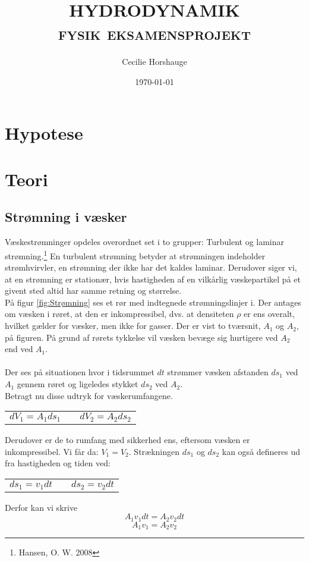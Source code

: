 \documentclass[a4paper, 11pt]{article}
\title{{\large \textsc{HYDRODYNAMIK\\fysik eksamensprojekt}}}
\author{Cecilie Horshauge}
\date{\today}
\begin{document}
\maketitle
\section{Hypotese}
\section{Teori}
\subsection{Strømning i væsker}
Væskestrømninger opdeles overordnet set i to grupper: Turbulent og laminar strømning.\footnote{Hansen, O. W. 2008}
En turbulent strømning betyder at strømningen indeholder strømhvirvler, en strømning der ikke har det kaldes laminar.
Derudover siger vi, at en strømning er stationær, hvis hastigheden af en vilkårlig væskepartikel på et givent sted altid har samme retning og størrelse.
\\
På figur \ref{fig:Strømning} ses et rør med indtegnede strømningslinjer i. Der antages om væsken i røret, at den er inkompressibel, 
dvs. at densiteten \(\rho\) er ens overalt, hvilket gælder for væsker, men ikke for gasser.
Der er vist to tværsnit, \(A_1\) og \(A_2\), på figuren. På grund af rørets tykkelse vil væsken bevæge sig hurtigere ved \(A_2\) end ved \(A_1\).\\\\
Der ses på situationen hvor i tidsrummet \(dt\) strømmer væsken afstanden \(ds_1\) ved \(A_1\) gennem røret og ligeledes stykket \(ds_2\) ved \(A_2\).\\
Betragt nu disse udtryk for væskerumfangene.
\begin{center}
    \begin{tabular}{ l c l }
     \(dV_1=A_1ds_1\) & & \(dV_2=A_2ds_2\)
    \end{tabular}
\end{center}
Derudover er de to rumfang med sikkerhed ens, eftersom væsken er inkompressibel. Vi får da: \(V_1 = V_2\). Strækningen \(ds_1\) og \(ds_2\) kan også defineres ud fra hastigheden og tiden ved:
\begin{center}
    \begin{tabular}{ l c l }
     \(ds_1=v_1dt\) & & \(ds_2=v_2dt\)
    \end{tabular}
\end{center}
Derfor kan vi skrive
\[A_1v_1dt = A_2v_2dt\]
\begin{equation}
    A_1v_1=A_2v_2
\end{equation}
\end{document}
